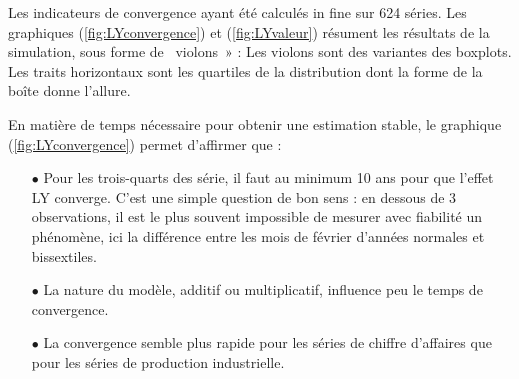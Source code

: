 \documentclass[12pt, a4paper, french]{article}
\begin{document}
Les indicateurs de convergence ayant été calculés in fine sur 624 séries. Les graphiques (\ref{fig:LYconvergence}) et (\ref{fig:LYvaleur}) résument les résultats de la simulation, sous forme de \og~violons~» : Les violons sont des variantes des boxplots. Les traits horizontaux sont les quartiles de la distribution dont la forme de la boîte donne l'allure. 

En matière de temps nécessaire pour obtenir une estimation stable, le graphique (\ref{fig:LYconvergence}) permet d'affirmer que :
\begin{itemize}
	\item[$\bullet$] Pour les trois-quarts des série, il faut au minimum 10 ans pour que l'effet LY converge. C'est une simple question de bon sens : en dessous de 3 observations, il est le plus souvent impossible de mesurer avec fiabilité un phénomène, ici la différence entre les mois de février d'années normales et bissextiles.
	\item[$\bullet$] La nature du modèle, additif ou multiplicatif, influence peu le temps de convergence.
	\item[$\bullet$] La convergence semble plus rapide pour les séries de chiffre d'affaires que pour les séries de production industrielle.
\end{itemize}
\end{document}
